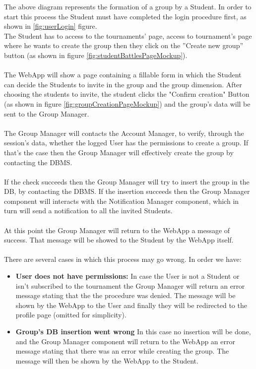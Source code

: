 \documentclass{article}
\begin{document}
{        
        The above diagram represents the formation of a group by a Student.
        In order to start this process the Student must have completed the login 
        procedure first, as shown in \ref{fig:userLogin} figure.\\  
        The Student has to access to the tournaments' page, access 
        to tournament's page where he wants to create the group then 
        they click on the ”Create new group” button (as shown in figure \ref{fig:studentBattlesPageMockup}).
        \\ \\
        The WebApp will show a page containing a fillable form in which the Student can decide the Students to
        invite in the group and the group dimension. After choosing the students to invite, the student 
        clicks the "Confirm creation" Button (as shown in figure \ref{fig:groupCreationPageMockup}) and the group's data 
        will be sent to the Group Manager.
        \\ \\
        The Group Manager will contacts the Account Manager, to verify, through
        the session’s data, whether the logged User has the permissions to create
        a group. If that’s the case then the Group Manager will effectively create
        the group by contacting the DBMS.
        \\ \\
        If the check succeeds then the Group Manager will try to insert the group
        in the DB, by contacting the DBMS.
        If the insertion succeeds then the Group Manager component will interacts with the 
        Notification Manager component, which in turn will send a notification to all the invited
        Students.
        \\ \\
        At this point the Group Manager will return to the WebApp a message of success. That message
        will be showed to the Student by the WebApp itself.
        \\ \\
        There are several cases in which this process may go wrong. In order we have:
        \begin{itemize}
            \item \textbf{User does not have permissions:} In case the User is not a Student
            or isn't subscribed to the tournament the Group Manager will return an error message 
            stating that the the procedure was denied. The message will be shown 
            by the WebApp to the User and finally they will be
            redirected to the profile page (omitted for simplicity).
            \item \textbf{Group's DB insertion went wrong} In this case no insertion will
            be done, and the Group Manager component will return to the WebApp 
            an error message stating that there was an error while creating the group. 
            The message will then be shown by the WebApp to the Student.
        \end{itemize}


}
\end{document}
